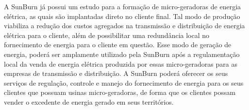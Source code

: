 A SunBurn já possui um estudo para a formação de micro-geradoras de energia elétrica, as quais são implantadas direto no cliente final. Tal modo de produção viabiliza a redução dos custos agregados na transmissão e distribuição de energia elétrica para o cliente, além de possibilitar uma redundância local no fornecimento de energia para o cliente em questão. Esse modo de geração de energia, poderá ser amplamente utilizado pela SunBurn após a regulamentação local da venda de energia elétrica produzida por essas micro-geradoras para as empresas de transmissão e distribuição. A SunBurn poderá oferecer os seus serviços de regulação, controle e manejo do fornecimento de energia para os seus clientes que possuam usinas micro-geradoras, de forma que os clientes possam vender o excedente de energia gerado em seus territórios.




